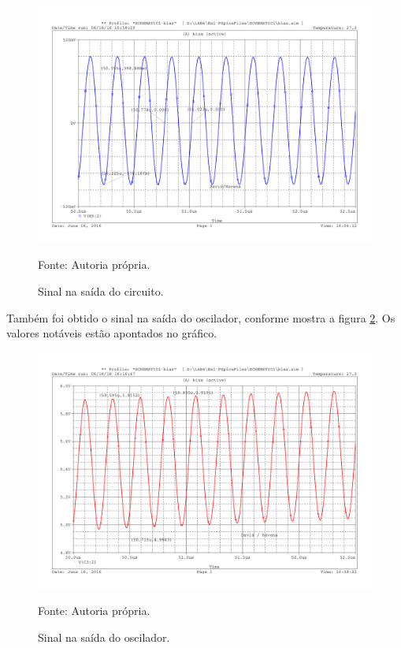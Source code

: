 \begin{figure}[H]
    \centering
    \caption{Sinal na saída do circuito.}\label{fig:out}
    \includegraphics[scale=0.5]{Imagens/out}
    
    \small Fonte: Autoria própria.
\end{figure}

Também foi obtido o sinal na saída do oscilador, conforme mostra a figura \ref{fig:osc}. Os valores notáveis estão apontados no gráfico.

\begin{figure}[H]
    \centering
    \caption{Sinal na saída do oscilador.}\label{fig:osc}
    \includegraphics[scale=0.5]{Imagens/osc}
    
    \small Fonte: Autoria própria.
\end{figure}


